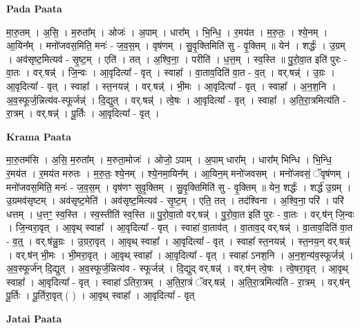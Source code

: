 \documentclass[17pt]{extarticle}
\begin{document}
\textbf{Pada Paata} \newline

मा॒रु॒तम् । अ॒सि॒ । म॒रुता᳚म् । ओजः॑ । अ॒पाम् । धारा᳚म् । भि॒न्धि॒ । र॒मय॑त । म॒रु॒तः॒ । श्ये॒नम् । आ॒यिन᳚म् । मनो॑जवस॒मिति॒ मनः॑ - ज॒व॒स॒म् । वृष॑णम् । सु॒वृ॒क्तिमिति॑ सु - वृ॒क्तिम् ॥ येन॑ । शर्द्धः॑ । उ॒ग्रम् । अव॑सृष्ट॒मित्यव॑ - सृ॒ष्ट॒म् । एति॑ । तत् । अ॒श्वि॒ना॒ । परीति॑ । ध॒त्त॒म् । स्व॒स्ति ॥ पु॒रो॒वा॒त इति॑ पुरः - वा॒तः । वर्.षन्न्॑ । जि॒न्वः । आ॒वृदित्या᳚ - वृत् । स्वाहा᳚ । वा॒ताव॒दिति॑ वा॒त - व॒त् । वर्.षन्न्॑ । उ॒ग्रः । आ॒वृदित्या᳚ - वृत् । स्वाहा᳚ । स्त॒नयन्न्॑ । वर्.षन्न्॑ । भी॒मः । आ॒वृदित्या᳚ - वृत् । स्वाहा᳚ । अ॒न॒श॒नि । अ॒व॒स्फूर्ज॒न्नित्य॑व-स्फूर्जन्न्॑ । दि॒द्युत् । वर्.षन्न्॑ । त्वे॒षः । आ॒वृदित्या᳚ - वृत् । स्वाहा᳚ । अ॒ति॒रा॒त्रमित्य॑ति - रा॒त्रम् । वर्.षन्न्॑ । पू॒र्तिः । आ॒वृदित्या᳚ - वृत् ।  \newline


\textbf{Krama Paata} \newline

मा॒रु॒तम॑सि । अ॒सि॒ म॒रुता᳚म् । म॒रुता॒मोजः॑ । ओजो॒ ऽपाम् । अ॒पाम् धारा᳚म् । धारा᳚म् भिन्धि । भि॒न्धि॒ र॒मय॑त । र॒मय॑त मरुतः । म॒रु॒तः॒ श्ये॒नम् । श्ये॒नमा॒यिन᳚म् । आ॒यिन॒म् मनो॑जवसम् । मनो॑जवसं॒ ॅवृष॑णम् । मनो॑जवस॒मिति॒ मनः॑ - 
ज॒व॒स॒म् । वृष॑णꣳ सुवृ॒क्तिम् । सु॒वृ॒क्तिमिति॑ सु - वृ॒क्तिम् ॥ येन॒ शर्द्धः॑ । शर्द्ध॑ उ॒ग्रम् । उ॒ग्रमव॑सृष्टम् । अव॑सृष्ट॒मेति॑ । अव॑सृष्ट॒मित्यव॑ - सृ॒ष्ट॒म् । एति॒ तत् । तद॑श्विना । अ॒श्वि॒ना॒ परि॑ । परि॑ धत्तम् । ध॒त्तꣳ॒॒ स्व॒स्ति । स्व॒स्तीति॑ स्व॒स्ति ॥ पु॒रो॒वा॒तो वर्.षन्न्॑ । पु॒रो॒वा॒त इति॑ पुरः - वा॒तः । 
वर्.ष॑न् जि॒न्वः । जि॒न्वरा॒वृत् । आ॒वृथ् स्वाहा᳚ । आ॒वृदित्या᳚ - वृत् । स्वाहा॑ वा॒ताव॑त् । वा॒ताव॒द् वर्.षन्न्॑ । वा॒ताव॒दिति॑ वा॒त - व॒त्॒ । वर्.ष॑न्नु॒ग्रः । उ॒ग्ररा॒वृत् । आ॒वृथ् स्वाहा᳚ । आ॒वृदित्या᳚ - वृत् । स्वाहा᳚ स्त॒नयन्न्॑ । स्त॒नय॒न् वर्.षन्न्॑ । वर्.ष॑न् भी॒मः । भी॒मरा॒वृत् । आ॒वृथ् स्वाहा᳚ । आ॒वृदित्या᳚ - वृत् । स्वाहा॑ ऽनश॒नि । अ॒न॒श॒न्य॑व॒स्फूर्जन्न्॑ । अ॒व॒स्फूर्ज॑न् दि॒द्युत् । अ॒व॒स्फूर्ज॒न्नित्य॑व - स्फूर्जन्न्॑ । दि॒द्युद् वर्.षन्न्॑ । वर्.ष॑न् त्वे॒षः । त्वे॒षरा॒वृत् । आ॒वृथ् स्वाहा᳚ । आ॒वृदित्या᳚ - वृत् । स्वाहा॑ ऽतिरा॒त्रम् । अ॒ति॒रा॒त्रं ॅवर्.षन्न्॑ । अ॒ति॒रा॒त्रमित्य॑ति - रा॒त्रम् । वर्.ष॑न् पू॒र्तिः । पू॒र्तिरा॒वृत् ( ) । आ॒वृथ् स्वाहा᳚ । आ॒वृदित्या᳚ - वृत् \newline

\textbf{Jatai Paata} \newline
\end{document}
